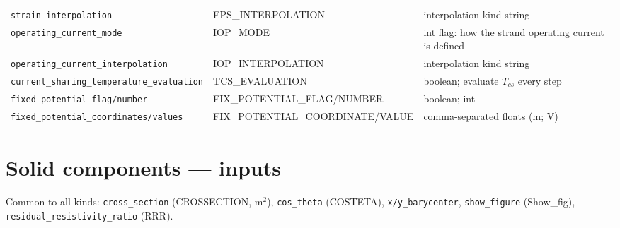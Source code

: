 \documentclass[10pt,a4paper]{article}
\newcommand{\code}[1]{\texttt{#1}}
\begin{document}
\begin{longtable}{p{5.6cm}p{3.4cm}p{6.2cm}}
\code{strain\_interpolation} & EPS\_INTERPOLATION & interpolation kind string \\
\code{operating\_current\_mode} & IOP\_MODE & int flag: how the strand operating current is defined \\
\code{operating\_current\_interpolation} & IOP\_INTERPOLATION & interpolation kind string \\
\code{current\_sharing\_temperature\_evaluation} & TCS\_EVALUATION & boolean; evaluate $T_{cs}$ every step \\
\code{fixed\_potential\_flag/number} & FIX\_POTENTIAL\_FLAG/NUMBER & boolean; int \\
\code{fixed\_potential\_coordinates/values} & FIX\_POTENTIAL\_COORDINATE/VALUE & comma-separated floats (m; V) \\
\bottomrule
\end{longtable}

\section*{Solid components --- inputs}

Common to all kinds: \code{cross\_section} (CROSSECTION, m$^2$),
\code{cos\_theta} (COSTETA), \code{x/y\_barycenter}, \code{show\_figure}
(Show\_fig), \code{residual\_resistivity\_ratio} (RRR).
\end{document}
